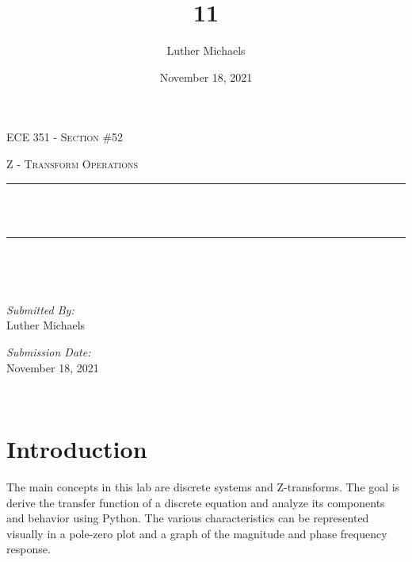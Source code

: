 \documentclass[12pt]{report}
\title{11}	%
\author{Luther Michaels}	%
\date{November 18, 2021}   %
\makeatletter
\let\thetitle\@title
\makeatother
\begin{document}
	
\begin{titlepage}
	\centering
	\vspace*{0.5 cm}
		
	\begin{center}    
		\textsc{\Large   ECE 351 - Section \#52}\\[2.0 cm]	
	\end{center}  
	\textsc{\Large Z - Transform Operations  }\\[0.5 cm]
	\rule{\linewidth}{0.2 mm} \\[0.4 cm]
	{ \huge \bfseries \thetitle}\\
	\rule{\linewidth}{0.2 mm} \\[1.5 cm]
	\begin{minipage}{0.4\textwidth}
		\begin{flushleft} \large
		\end{flushleft}
	\end{minipage}~
	\begin{minipage}{0.4\textwidth}
		\begin{flushright} \large
			\emph{Submitted By:} \\
			Luther Michaels \break
			
			\emph{Submission Date:} \\
			November 18, 2021
		\end{flushright}
	\end{minipage}\\[2 cm]
\end{titlepage}
	

\tableofcontents
\pagebreak

\renewcommand{\thesection}{\arabic{section}}
\section{Introduction}
		  
The main concepts in this lab are discrete systems and Z-transforms. The goal is derive the transfer function of a discrete equation and analyze its components and behavior using Python. The various characteristics can be represented visually in a pole-zero plot and a graph of the magnitude and phase frequency response. \\
\end{document}
